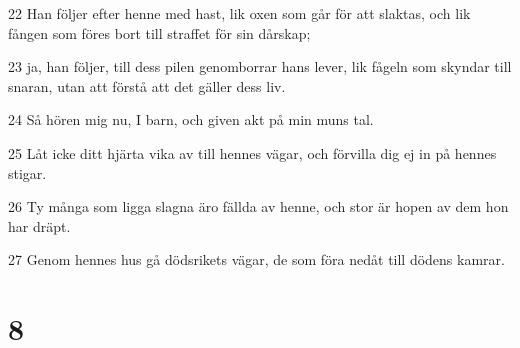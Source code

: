\par 22 Han följer efter henne med hast, lik oxen som går för att slaktas, och lik fången som föres bort till straffet för sin dårskap;
\par 23 ja, han följer, till dess pilen genomborrar hans lever, lik fågeln som skyndar till snaran, utan att förstå att det gäller dess liv.
\par 24 Så hören mig nu, I barn, och given akt på min muns tal.
\par 25 Låt icke ditt hjärta vika av till hennes vägar, och förvilla dig ej in på hennes stigar.
\par 26 Ty många som ligga slagna äro fällda av henne, och stor är hopen av dem hon har dräpt.
\par 27 Genom hennes hus gå dödsrikets vägar, de som föra nedåt till dödens kamrar.

\chapter{8}

